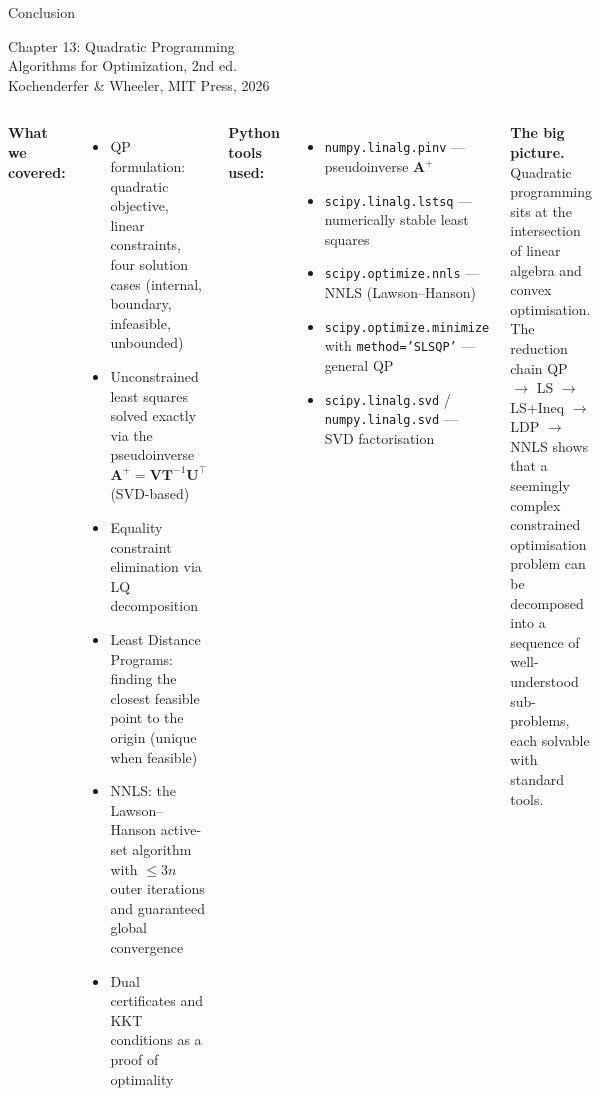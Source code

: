 \documentclass[aspectratio=169,10pt]{beamer}
\newcommand{\bA}{\mathbf{A}}
\newcommand{\bU}{\mathbf{U}}
\newcommand{\bV}{\mathbf{V}}
\newcommand{\bT}{\mathbf{T}}
\begin{document}
\begin{frame}[allowframebreaks]{Conclusion}

  \begin{center}
    {\Large Chapter 13: Quadratic Programming}\\[0.8em]
    {\large Algorithms for Optimization, 2nd ed.}\\[0.5em]
    Kochenderfer \& Wheeler, MIT Press, 2026
  \end{center}

  \vspace{0.8em}

  \begin{columns}[T]
      \textbf{What we covered:}
      \begin{itemize}
        \item QP formulation: quadratic objective, linear constraints, four
              solution cases (internal, boundary, infeasible, unbounded)
        \item Unconstrained least squares solved exactly via the pseudoinverse
              $\bA^+ = \bV\bT^{-1}\bU^{\top}$ (SVD-based)
        \item Equality constraint elimination via LQ decomposition
        \item Least Distance Programs: finding the closest feasible point
              to the origin (unique when feasible)
        \item NNLS: the Lawson--Hanson active-set algorithm with $\leq 3n$
              outer iterations and guaranteed global convergence
        \item Dual certificates and KKT conditions as a proof of optimality
      \end{itemize}

      \textbf{Python tools used:}
      \begin{itemize}
        \item \texttt{numpy.linalg.pinv} --- pseudoinverse $\bA^+$
        \item \texttt{scipy.linalg.lstsq} --- numerically stable least squares
        \item \texttt{scipy.optimize.nnls} --- NNLS (Lawson--Hanson)
        \item \texttt{scipy.optimize.minimize} with \texttt{method='SLSQP'} --- general QP
        \item \texttt{scipy.linalg.svd} / \texttt{numpy.linalg.svd} --- SVD factorisation
      \end{itemize}

      \vspace{0.6em}
      \textbf{The big picture.}  Quadratic programming sits at the intersection
      of linear algebra and convex optimisation.  The reduction chain
      QP $\to$ LS $\to$ LS+Ineq $\to$ LDP $\to$ NNLS shows that a seemingly
      complex constrained optimisation problem can be decomposed into a sequence
      of well-understood sub-problems, each solvable with standard tools.
  \end{columns}

\end{frame}
\end{document}
